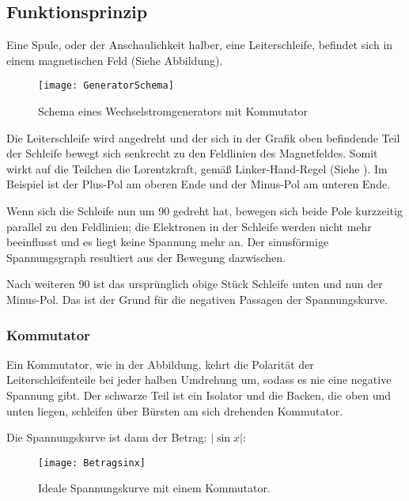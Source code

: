 \subsection{Funktionsprinzip}

Eine Spule, oder der Anschaulichkeit halber, eine Leiterschleife, befindet sich in einem magnetischen Feld (Siehe Abbildung).

\begin{figure}[h!]
	\centering
	\texttt{[image: GeneratorSchema]}
	\caption{Schema eines Wechselstromgenerators mit Kommutator} 
\end{figure}


Die Leiterschleife wird angedreht und der sich in der Grafik oben befindende Teil der Schleife bewegt sich senkrecht zu den Feldlinien des Magnetfeldes. Somit wirkt auf die Teilchen die Lorentzkraft, gemäß Linker-Hand-Regel (Siehe ). Im Beispiel ist der Plus-Pol am oberen Ende und der Minus-Pol am unteren Ende.

Wenn sich die Schleife nun um 90\degree{} gedreht hat, bewegen sich beide Pole kurzzeitig parallel zu den Feldlinien; die Elektronen in der Schleife werden nicht mehr beeinflusst und es liegt keine Spannung mehr an. Der sinusförmige Spannungsgraph resultiert aus der Bewegung dazwischen.

Nach weiteren 90\degree{} ist das ursprünglich obige Stück Schleife unten und nun der Minus-Pol. Das ist der Grund für die negativen Passagen der Spannungskurve.


\subsubsection{Kommutator}

Ein Kommutator, wie in der Abbildung, kehrt die Polarität der Leiterschleifenteile bei jeder halben Umdrehung um, sodass es nie eine negative Spannung gibt. Der schwarze Teil ist ein Isolator und die Backen, die oben und unten liegen, schleifen über Bürsten am sich drehenden Kommutator.

Die Spannungskurve ist dann der Betrag: $|\sin x|$:

\begin{figure}[h!]
	\centering
	\texttt{[image: Betragsinx]}
	\caption{Ideale Spannungskurve mit einem Kommutator.} 
\end{figure}


